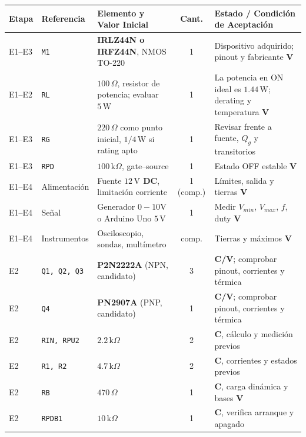\documentclass[10pt, a4paper, landscape]{article}
\begin{document}
\par\vspace{0.15cm}\noindent
\renewcommand{\arraystretch}{1.2}
{\footnotesize
\begin{tabularx}{\linewidth}{|p{1.3cm}|p{2.2cm}|p{6.8cm}|c|>{\raggedright\arraybackslash}X|}
\hline
\rowcolor{ucbgray}
\textbf{Etapa} & \textbf{Referencia} & \textbf{Elemento y Valor Inicial} & \textbf{Cant.} & \textbf{Estado / Condición de Aceptación} \\ \hline
E1--E3 & \texttt{M1} & \textbf{IRLZ44N o IRFZ44N}, NMOS TO-220 & 1 & Dispositivo adquirido; pinout y fabricante \textbf{V} \\ \hline
E1--E2 & \texttt{RL} & \textbf{$100\,\Omega$}, resistor de potencia; evaluar \textbf{$5\,\text{W}$} & 1 & La potencia en ON ideal es $1.44\,\text{W}$; derating y temperatura \textbf{V} \\ \hline
E1--E3 & \texttt{RG} & \textbf{$220\,\Omega$} como punto inicial, $1/4\,\text{W}$ si rating apto & 1 & Revisar frente a fuente, $Q_g$ y transitorios \\ \hline
E1--E3 & \texttt{RPD} & \textbf{$100\,\text{k}\Omega$}, gate--source & 1 & Estado OFF estable \textbf{V} \\ \hline
E1--E4 & Alimentación & Fuente \textbf{$12\,\text{V}$ DC}, limitación corriente & 1 (comp.) & Límites, salida y tierras \textbf{V} \\ \hline
E1--E4 & Señal & Generador $0-10\text{V}$ o Arduino Uno $5\,\text{V}$ & 1 & Medir $V_{min}$, $V_{max}$, $f$, duty \textbf{V} \\ \hline
E1--E4 & Instrumentos & Osciloscopio, sondas, multímetro & comp. & Tierras y máximos \textbf{V} \\ \hline
E2 & \texttt{Q1, Q2, Q3} & \textbf{P2N2222A} (NPN, candidato) & 3 & \textbf{C/V}; comprobar pinout, corrientes y térmica \\ \hline
E2 & \texttt{Q4} & \textbf{PN2907A} (PNP, candidato) & 1 & \textbf{C/V}; comprobar pinout, corrientes y térmica \\ \hline
E2 & \texttt{RIN, RPU2} & \textbf{$2.2\,\text{k}\Omega$} & 2 & \textbf{C}, cálculo y medición previos \\ \hline
E2 & \texttt{R1, R2} & \textbf{$4.7\,\text{k}\Omega$} & 2 & \textbf{C}, corrientes y estados previos \\ \hline
E2 & \texttt{RB} & \textbf{$470\,\Omega$} & 1 & \textbf{C}, carga dinámica y bases \textbf{V} \\ \hline
E2 & \texttt{RPDB1} & \textbf{$10\,\text{k}\Omega$} & 1 & \textbf{C}, verifica arranque y apagado \\ \hline

\end{tabularx}}
\end{document}
